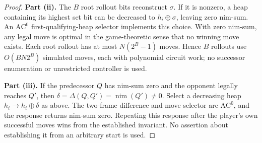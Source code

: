 \documentclass[twoside,11pt]{article}
\newcommand{\AC}{\mathrm{AC}}
\numberwithin{theorem}{section}
\numberwithin{equation}{section}
\begin{document}
\begin{proof}
\textbf{Part (ii).} The $B$ root rollout bits reconstruct $\sigma$. If it is nonzero, a heap containing its highest set bit can be decreased to $h_i\oplus\sigma$, leaving zero nim-sum. An $\AC^0$ first-qualifying-heap selector implements this choice. With zero nim-sum, any legal move is optimal in the game-theoretic sense that no winning move exists. Each root rollout has at most $N(2^B-1)$ moves. Hence $B$ rollouts use $O(BN2^B)$ simulated moves, each with polynomial circuit work; no successor enumeration or unrestricted controller is used.

\textbf{Part (iii).} If the predecessor $Q$ has nim-sum zero and the opponent legally reaches $Q'$, then $\delta=\Delta(Q,Q')=\operatorname{nim}(Q')\ne0$. Select a decreasing heap $h_i\to h_i\oplus\delta$ as above. The two-frame difference and move selector are $\AC^0$, and the response returns nim-sum zero. Repeating this response after the player's own successful moves wins from the established invariant. No assertion about establishing it from an arbitrary start is used.
\end{proof}
\end{document}
